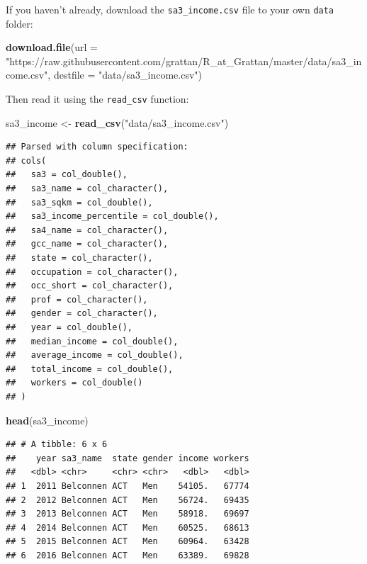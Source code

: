 \documentclass[
]{book}
\newenvironment{Shaded}{\begin{snugshade}}{\end{snugshade}}
\newcommand{\DataTypeTok}[1]{\textcolor[rgb]{0.13,0.29,0.53}{#1}}
\newcommand{\KeywordTok}[1]{\textcolor[rgb]{0.13,0.29,0.53}{\textbf{#1}}}
\newcommand{\NormalTok}[1]{#1}
\newcommand{\StringTok}[1]{\textcolor[rgb]{0.31,0.60,0.02}{#1}}
\begin{document}
If you haven't already, download the \texttt{sa3\_income.csv} file to your own \texttt{data} folder:

\begin{Shaded}
\begin{Highlighting}[]
\KeywordTok{download.file}\NormalTok{(}\DataTypeTok{url =} \StringTok{"https://raw.githubusercontent.com/grattan/R\_at\_Grattan/master/data/sa3\_income.csv"}\NormalTok{,}
              \DataTypeTok{destfile =} \StringTok{"data/sa3\_income.csv"}\NormalTok{)}
\end{Highlighting}
\end{Shaded}

Then read it using the \texttt{read\_csv} function:

\begin{Shaded}
\begin{Highlighting}[]
\NormalTok{sa3\_income \textless{}{-}}\StringTok{ }\KeywordTok{read\_csv}\NormalTok{(}\StringTok{"data/sa3\_income.csv"}\NormalTok{)}
\end{Highlighting}
\end{Shaded}

\begin{verbatim}
## Parsed with column specification:
## cols(
##   sa3 = col_double(),
##   sa3_name = col_character(),
##   sa3_sqkm = col_double(),
##   sa3_income_percentile = col_double(),
##   sa4_name = col_character(),
##   gcc_name = col_character(),
##   state = col_character(),
##   occupation = col_character(),
##   occ_short = col_character(),
##   prof = col_character(),
##   gender = col_character(),
##   year = col_double(),
##   median_income = col_double(),
##   average_income = col_double(),
##   total_income = col_double(),
##   workers = col_double()
## )
\end{verbatim}

\begin{Shaded}
\begin{Highlighting}[]
\KeywordTok{head}\NormalTok{(sa3\_income)}
\end{Highlighting}
\end{Shaded}

\begin{verbatim}
## # A tibble: 6 x 6
##    year sa3_name  state gender income workers
##   <dbl> <chr>     <chr> <chr>   <dbl>   <dbl>
## 1  2011 Belconnen ACT   Men    54105.   67774
## 2  2012 Belconnen ACT   Men    56724.   69435
## 3  2013 Belconnen ACT   Men    58918.   69697
## 4  2014 Belconnen ACT   Men    60525.   68613
## 5  2015 Belconnen ACT   Men    60964.   63428
## 6  2016 Belconnen ACT   Men    63389.   69828
\end{verbatim}
\end{document}

